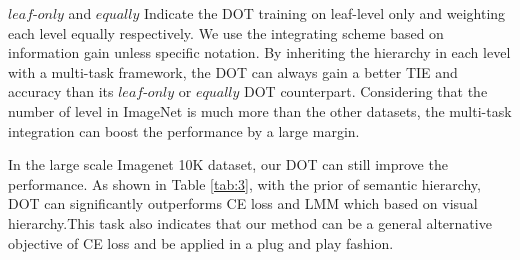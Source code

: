 \documentclass{article}
\theoremstyle{plain}%
\begin{document}
 


 
$leaf$-$only$ and $equally$ Indicate the DOT training on leaf-level only and weighting each level equally respectively. We use the integrating scheme based on information gain unless specific notation. By inheriting the hierarchy in each level with a multi-task framework, the DOT can always gain a better TIE and accuracy than its $leaf$-$only$ or $equally$ DOT counterpart. Considering that the number of level in ImageNet is much more than the other datasets, the multi-task integration can boost the performance by a large margin.


 


  
 






  

In the large scale Imagenet 10K dataset, our DOT can still improve the performance. As shown in Table \ref{tab:3}, with the prior of semantic hierarchy, DOT can significantly outperforms CE loss and LMM which based on visual hierarchy.This task also indicates that our method can be a general alternative objective of CE loss and be applied in a plug and play fashion. %



 
\end{document}
